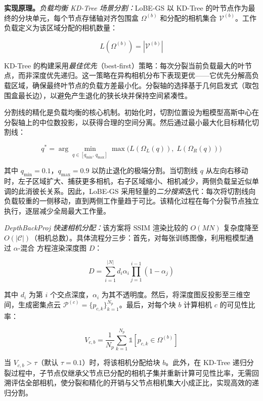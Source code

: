 \textbf{实现原理。}\emph{负载均衡 KD-Tree 场景分割：}LoBE-GS 以 KD-Tree 的叶节点作为最终的分块单元，每个节点存储轴对齐包围盒 $\Omega^{(b)}$ 和分配的相机集合 $\mathcal{V}^{(b)}$。工作负载定义为该区域分配的相机数量：

\begin{equation}
L(\Omega^{(b)}) = |\mathcal{V}^{(b)}|
\end{equation}

KD-Tree 的构建采用\emph{最佳优先}（best-first）策略：每次分裂当前负载最大的叶节点，而非深度优先递归。这一策略在异构相机分布下表现更优——它优先分解高负载区域，确保最终叶节点的负载方差最小化。分裂轴的选择基于几何启发式（取包围盒最长边），以避免产生退化的狭长块并保持空间紧凑性。

分割线的精化是负载均衡的核心机制。初始化时，切割位置设为粗模型高斯中心在分裂轴上的中位数投影，以获得合理的空间分离。然后通过最小最大化目标精化切割线：

\begin{equation}
q^* = \arg\min_{q \in [q_{\min},\, q_{\max}]} \max\!\big(L(\Omega_L(q)),\; L(\Omega_R(q))\big)
\end{equation}

其中 $q_{\min} = 0.1$，$q_{\max} = 0.9$ 以防止退化的极端分割。当切割线 $q$ 从左向右移动时，左子区域扩大、捕获更多相机，右子区域缩小、相机减少，两侧负载呈近似单调的此消彼长关系。因此，LoBE-GS 采用轻量的\emph{二分搜索}迭代：每次将切割线向负载较重的一侧移动，直到两侧工作量趋于可比。该精化过程在每个分裂节点独立执行，逐层减少全局最大工作量。

\emph{DepthBackProj 快速相机分配：}该方案将 SSIM 渲染比较的 $O(MN)$ 复杂度降至 $O(|\mathcal{C}|)$（相机总数）。具体流程分三步：首先，对每张训练图像，利用粗模型通过 $\alpha$-混合 方程渲染深度图 $D$：

\begin{equation}
D = \sum_{i=1}^{|N|} d_i \alpha_i \prod_{j=1}^{i-1}(1-\alpha_j)
\end{equation}

其中 $d_i$ 为第 $i$ 个交点深度，$\alpha_i$ 为其不透明度。然后，将深度图反投影至三维空间，生成密集点云 $\mathcal{P}^{(c)} = \{p_{c,k}\}_{k=1}^{N_p}$。最后，对每个块 $b$ 计算相机 $c$ 的可见性比率：

\begin{equation}
V_{c,b} = \frac{1}{N_p}\sum_{k=1}^{N_p} \mathbb{1}[p_{c,k} \in \Omega^{(b)}]
\end{equation}

当 $V_{c,b} > \tau$（默认 $\tau = 0.1$）时，将该相机分配给块 $b$。此外，在 KD-Tree 递归分裂过程中，子节点仅继承父节点已分配的相机子集并重新计算可见性比率，无需回溯评估全部相机，使分裂和精化的开销与父节点相机集大小成正比，实现高效的递归分割。

